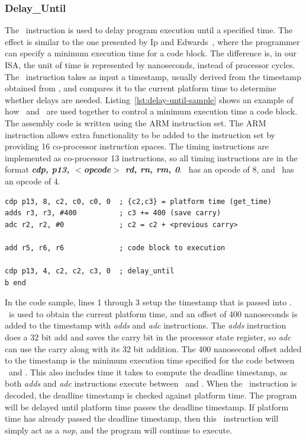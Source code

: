 \subsubsection{Delay\_Until}
The \delayuntil\ instruction is used to delay program execution until a specified time.
The effect is similar to the one presented by Ip and Edwards~\cite{ip2006processor}, where the programmer can specify a minimum execution time for a code block.
The difference is, in our ISA, the unit of time is represented by nanoseconds, instead of processor cycles.
The \delayuntil\ instruction takes as input a timestamp, usually derived from the timestamp obtained from \gettime, and compares it to the current platform time to determine whether delays are needed.
Listing~\ref{lst:delay-until-sample} shows an example of how \delayuntil\ and \gettime\ are used together to control a minimum execution time a code block.
The assembly code is written using the ARM instruction set.
The ARM instruction allows extra functionality to be added to the instruction set by providing 16 co-processor instruction spaces.  
The timing instructions are implemented as co-processor 13 instructions, so all timing instructions are in the format \textbf{\textit{cdp, p13, $<$opcode$>$ rd, rn, rm, 0}}.
\Gettime\ has an opcode of 8, and \delayuntil\ has an opcode of 4.

\begin{lstlisting}[float=h, label=lst:delay-until-sample,caption=Sample assembly code of delay\_until ]
cdp p13, 8, c2, c0, c0, 0  ; {c2,c3} = platform time (get_time)
adds r3, r3, #400          ; c3 += 400 (save carry)
adc r2, r2, #0             ; c2 = c2 + <previous carry> 

add r5, r6, r6             ; code block to execution

cdp p13, 4, c2, c2, c3, 0  ; delay_until 
b end
\end{lstlisting}

In the code sample, lines 1 through 3 setup the timestamp that is passed into \delayuntil. 
\Gettime\ is used to obtain the current platform time, and an offset of 400 nanoseconds is added to the timestamp with \emph{adds} and \emph{adc} instructions.
The \emph{adds} instruction does a 32 bit add and saves the carry bit in the processor state register, so \emph{adc} can use the carry along with its 32 bit addition.
The 400 nanosecond offset added to the timestamp is the minimum execution time specified for the code between \gettime\ and \delayuntil.
This also includes time it takes to compute the deadline timestamp, as both \emph{adds} and \emph{adc} instructions execute between \gettime\ and \delayuntil.
When the \delayuntil\ instruction is decoded, the deadline timestamp is checked against platform time.
The program will be delayed until platform time passes the deadline timestamp. 
If platform time has already passed the deadline timestamp, then this \delayuntil\ instruction will simply act as a \emph{nop}, and the program will continue to execute. 


